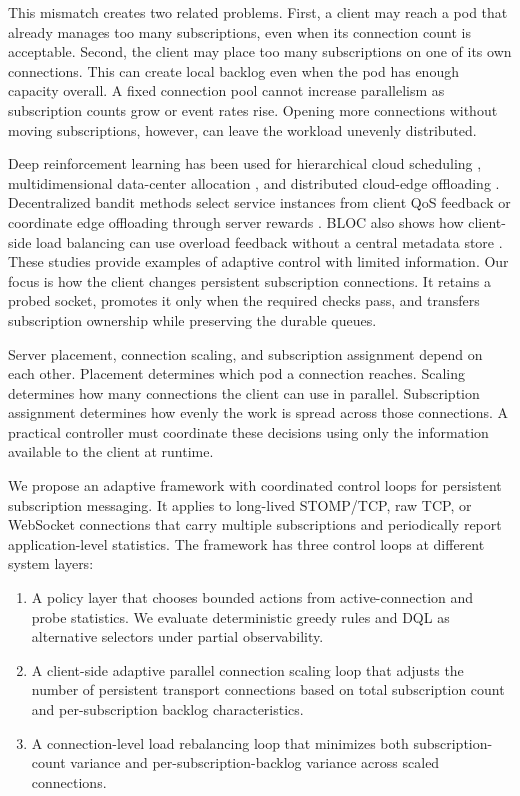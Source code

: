 \documentclass[manuscript]{acmart}
\begin{document}
This mismatch creates two related problems. First, a client may reach a pod that already manages too many subscriptions, even when its connection count is acceptable. Second, the client may place too many subscriptions on one of its own connections. This can create local backlog even when the pod has enough capacity overall. A fixed connection pool cannot increase parallelism as subscription counts grow or event rates rise. Opening more connections without moving subscriptions, however, can leave the workload unevenly distributed.

Deep reinforcement learning has been used for hierarchical cloud scheduling \cite{Zhou2022DRLSelector}, multidimensional data-center allocation \cite{Wei2023TNSM}, and distributed cloud-edge offloading \cite{Nieto2024DRLOffloading}. Decentralized bandit methods select service instances from client QoS feedback \cite{Cilic2025} or coordinate edge offloading through server rewards \cite{Yahya2024}. BLOC also shows how client-side load balancing can use overload feedback without a central metadata store \cite{Bhattacharya2024}. These studies provide examples of adaptive control with limited information. Our focus is how the client changes persistent subscription connections. It retains a probed socket, promotes it only when the required checks pass, and transfers subscription ownership while preserving the durable queues.

Server placement, connection scaling, and subscription assignment depend on each other. Placement determines which pod a connection reaches. Scaling determines how many connections the client can use in parallel. Subscription assignment determines how evenly the work is spread across those connections. A practical controller must coordinate these decisions using only the information available to the client at runtime.

We propose an adaptive framework with coordinated control loops for persistent subscription messaging. It applies to long-lived STOMP/TCP, raw TCP, or WebSocket connections that carry multiple subscriptions and periodically report application-level statistics. The framework has three control loops at different system layers:

\begin{enumerate}
	\item A policy layer that chooses bounded actions from active-connection and probe statistics. We evaluate deterministic greedy rules and DQL as alternative selectors under partial observability.
	
	\item A client-side adaptive parallel connection scaling loop that adjusts the number of persistent transport connections based on total subscription count and per-subscription backlog characteristics.
	
	\item A connection-level load rebalancing loop that minimizes both subscription-count variance and per-subscription-backlog variance across scaled connections.
\end{enumerate}
\end{document}
